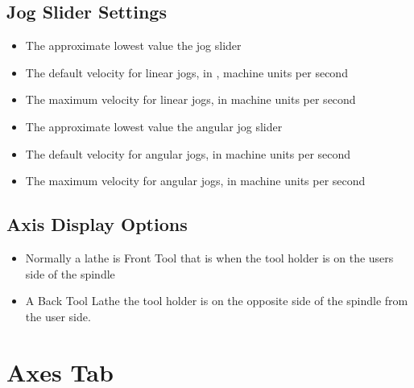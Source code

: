 \documentclass[letterpaper,10pt,english,openany,oneside]{sphinxmanual}
\begin{document}
\section{Jog Slider Settings}
\label{\detokenize{display:jog-slider-settings}}\begin{itemize}
\item {} 
 \sphinxhyphen{} The approximate lowest value the jog slider

\item {} 
 \sphinxhyphen{} The default velocity for linear jogs, in ,
machine units per second

\item {} 
 \sphinxhyphen{} The maximum velocity for linear jogs, in
machine units per second

\item {} 
 \sphinxhyphen{} The approximate lowest value the angular
jog slider

\item {} 
 \sphinxhyphen{} The default velocity for angular jogs, in
machine units per second

\item {} 
 \sphinxhyphen{} The maximum velocity for angular jogs, in
machine units per second

\end{itemize}


\section{Axis Display Options}
\label{\detokenize{display:axis-display-options}}\begin{itemize}
\item {} 
 \sphinxhyphen{} Normally a lathe is Front Tool that is when the
tool holder is on the users side of the spindle

\item {} 
 \sphinxhyphen{} A Back Tool Lathe the tool holder is on the
opposite side of the spindle from the user side.

\end{itemize}


\chapter{Axes Tab}
\label{\detokenize{axes:axes-tab}}\label{\detokenize{axes::doc}}
\end{document}
